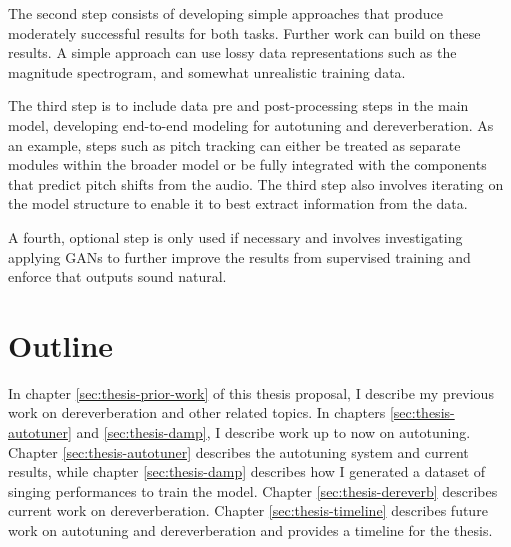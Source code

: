 The second step consists of developing simple approaches that produce moderately successful results for both tasks. Further work can build on these results. A simple approach can use lossy data representations such as the magnitude spectrogram, and somewhat unrealistic training data. 

The third step is to include data pre and post-processing steps in the main model, developing end-to-end modeling for autotuning and dereverberation. As an example, steps such as pitch tracking can either be treated as separate modules within the broader model or be fully integrated with the components that predict pitch shifts from the audio. The third step also involves iterating on the model structure to enable it to best extract information from the data. 

A fourth, optional step is only used if necessary and involves investigating applying GANs to further improve the results from supervised training and enforce that outputs sound natural.

\section{Outline}
In chapter \ref{sec:thesis-prior-work} of this thesis proposal, I describe my previous work on dereverberation and other related topics. In chapters \ref{sec:thesis-autotuner} and \ref{sec:thesis-damp}, I describe work up to now on autotuning. Chapter \ref{sec:thesis-autotuner} describes the autotuning system and current results, while chapter \ref{sec:thesis-damp} describes how I generated a dataset of singing performances to train the model. Chapter \ref{sec:thesis-dereverb} describes current work on dereverberation. Chapter \ref{sec:thesis-timeline} describes future work on autotuning and dereverberation and provides a timeline for the thesis.